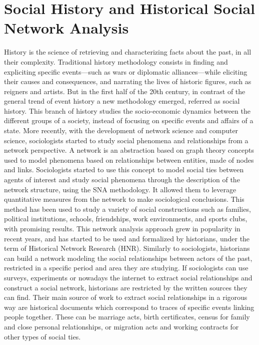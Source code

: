 \section{Social History and Historical Social Network Analysis}

History is the science of retrieving and characterizing facts about the past, in all their complexity.
Traditional history methodology consists in finding and expliciting specific events---such as wars or diplomatic alliances---while eliciting their causes and consequences, and narrating the lives of historic figures, such as reigners and artists.
But in the first half of the 20th century, in contrast of the general trend of event history a new methodology emerged, referred as social history.
This branch of history studies the socio-economic dynamics between the different groups of a society, instead of focusing on specific events and affairs of a state.
More recently, with the development of network science and computer science, sociologists started to study social phenomena and relationships from a network perspective.
A network is an abstraction based on graph theory concepts used to model phenomena based on relationships between entities, made of nodes and links.
Sociologists started to use this concept to model social ties between agents of interest and study social phenomena through the description of the network structure, using the SNA methodology.
It allowed them to leverage quantitative measures from the network to make sociological conclusions.
This method has been used to study a variety of social constructions such as families, political institutions, schools, friendships, work environments, and sports clubs, with promising results.
This network analysis approach grew in popularity in recent years, and has started to be used and formalized by historians, under the term of Historical Network Research (HNR).
Similarly to sociologists, historians can build a network modeling the social relationships between actors of the past, restricted in a specific period and area they are studying.
If sociologists can use surveys, experiments or nowadays the internet to extract social relationships and construct a social network, historians are restricted by the written sources they can find.
Their main source of work to extract social relationships in a rigorous way are historical documents which correspond to traces of specific events linking people together.
These can be marriage acts, birth certificates, census for family and close personal relationships, or migration acts and working contracts for other types of social ties.
